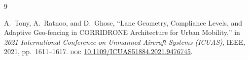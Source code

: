 \documentclass[12pt,a4paper]{article}
\begin{document}
\begin{thebibliography}{9}

A.~Tony, A.~Ratnoo, and D.~Ghose,
``Lane Geometry, Compliance Levels, and Adaptive Geo-fencing in CORRIDRONE Architecture for Urban Mobility,''
in \textit{2021 International Conference on Unmanned Aircraft Systems (ICUAS)},
IEEE, 2021, pp.~1611--1617.
\textsc{doi}: \href{https://doi.org/10.1109/ICUAS51884.2021.9476745}{10.1109/ICUAS51884.2021.9476745}.

\end{thebibliography}
\end{document}
